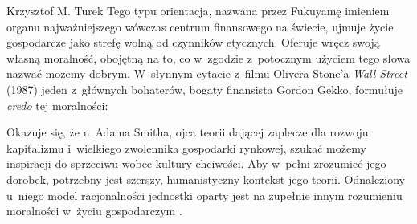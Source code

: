 \begin{artplenv}{Krzysztof M. Turek}
Tego typu orientacja, nazwana przez Fukuyamę imieniem organu najważniejszego wówczas centrum finansowego na świecie,
ujmuje życie gospodarcze jako strefę wolną od czynników etycznych. Oferuje wręcz swoją własną moralność, obojętną na
to, co w~zgodzie z~potocznym użyciem tego słowa nazwać możemy dobrym. W~słynnym cytacie z~filmu Olivera Stone'a
\textit{Wall Street} (1987) jeden z~głównych bohaterów, bogaty finansista Gordon Gekko, formułuje \textit{credo} tej
moralności: 


Okazuje się, że u~Adama Smitha, ojca teorii dającej zaplecze dla rozwoju kapitalizmu i~wielkiego zwolennika gospodarki
rynkowej, szukać możemy inspiracji do sprzeciwu wobec kultury chciwości. Aby w~pełni zrozumieć jego dorobek, potrzebny
jest szerszy, humanistyczny kontekst jego teorii. Odnaleziony u~niego model racjonalności jednostki oparty jest na
zupełnie innym rozumieniu moralności w~życiu gospodarczym
\parencite[zob. np.][]{przybyla_adam_2006}.


\end{artplenv}

